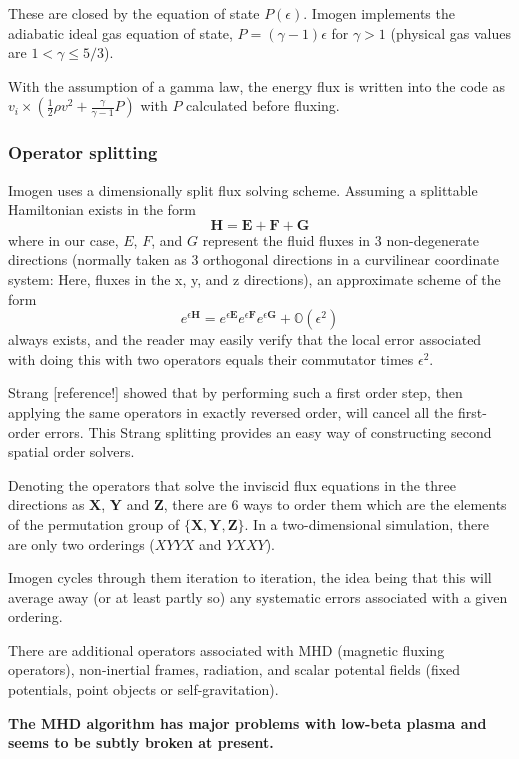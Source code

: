 \documentclass[letterpaper,12pt]{article}
\begin{document}
These are closed by the equation of state $P(\epsilon)$. Imogen implements the
adiabatic ideal gas equation of state, $P = (\gamma-1)\epsilon$ for $\gamma > 1$
(physical gas values are $1 < \gamma \le 5/3$).

With the assumption of a gamma law, the energy flux is written into the
code as $v_i \times (\frac{1}{2} \rho v^2 + \frac{\gamma}{\gamma-1}P)$ with $P$ calculated
before fluxing.

\subsubsection{Operator splitting}

Imogen uses a dimensionally split flux solving scheme. Assuming a splittable Hamiltonian
exists in the form
\[\mathbf{H} = \mathbf{E} + \mathbf{F} + \mathbf{G}\]
where in our case, $E$, $F$, and $G$ represent the fluid fluxes in 3 non-degenerate
directions (normally taken as 3 orthogonal directions in a curvilinear coordinate
system: Here, fluxes in the x, y, and z directions), an approximate scheme of the form
\[e^{\epsilon \mathbf{H}} = e^{\epsilon \mathbf{E}} e^{\epsilon \mathbf{F}}
e^{\epsilon \mathbf{G}} + \mathbb{O}(\epsilon^2) \]
always exists, and the reader may easily verify that the local error associated with
doing this with two operators equals their commutator times $\epsilon^2$.

Strang [reference!] showed that by performing such a first order step, then
applying the same operators in exactly reversed order, will cancel all the first-order
errors. This Strang splitting provides an easy way of constructing second spatial order
solvers.

Denoting the operators that solve the inviscid flux equations in the three directions as
$\mathbf{X}$, $\mathbf{Y}$ and $\mathbf{Z}$, there are 6 ways to order them which are the
elements of the permutation group of $\{ \mathbf{X}, \mathbf{Y}, \mathbf{Z} \}$.
In a two-dimensional simulation, there are only two orderings ($XYYX$ and $YXXY$).

Imogen cycles through them iteration to iteration, the idea being that this will average
away (or at least partly so) any systematic errors associated with a given ordering.

There are additional operators associated with MHD (magnetic fluxing operators), non-inertial
frames, radiation, and scalar potental fields (fixed potentials, point objects or
self-gravitation).

\textbf{The MHD algorithm has major problems with low-beta plasma and seems to be
subtly broken at present.}
\end{document}
